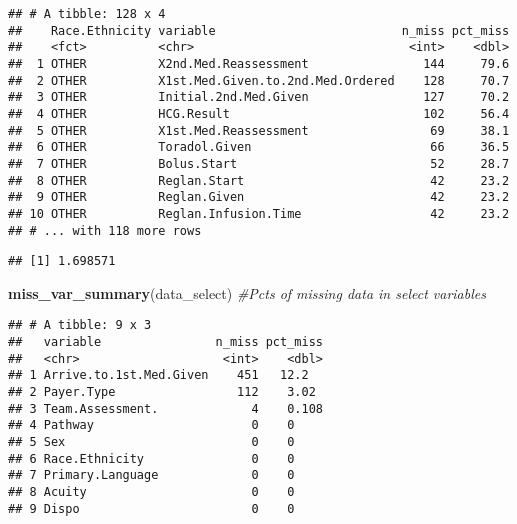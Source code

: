 \documentclass[]{article}
\newenvironment{Shaded}{\begin{snugshade}}{\end{snugshade}}
\newcommand{\KeywordTok}[1]{\textcolor[rgb]{0.13,0.29,0.53}{\textbf{#1}}}
\newcommand{\StringTok}[1]{\textcolor[rgb]{0.31,0.60,0.02}{#1}}
\newcommand{\CommentTok}[1]{\textcolor[rgb]{0.56,0.35,0.01}{\textit{#1}}}
\newcommand{\OperatorTok}[1]{\textcolor[rgb]{0.81,0.36,0.00}{\textbf{#1}}}
\newcommand{\NormalTok}[1]{#1}
\begin{document}
\begin{verbatim}
## # A tibble: 128 x 4
##    Race.Ethnicity variable                          n_miss pct_miss
##    <fct>          <chr>                              <int>    <dbl>
##  1 OTHER          X2nd.Med.Reassessment                144     79.6
##  2 OTHER          X1st.Med.Given.to.2nd.Med.Ordered    128     70.7
##  3 OTHER          Initial.2nd.Med.Given                127     70.2
##  4 OTHER          HCG.Result                           102     56.4
##  5 OTHER          X1st.Med.Reassessment                 69     38.1
##  6 OTHER          Toradol.Given                         66     36.5
##  7 OTHER          Bolus.Start                           52     28.7
##  8 OTHER          Reglan.Start                          42     23.2
##  9 OTHER          Reglan.Given                          42     23.2
## 10 OTHER          Reglan.Infusion.Time                  42     23.2
## # ... with 118 more rows
\end{verbatim}

\begin{Shaded}
\end{Shaded}

\begin{verbatim}
## [1] 1.698571
\end{verbatim}

\begin{Shaded}
\begin{Highlighting}[]
\KeywordTok{miss_var_summary}\NormalTok{(data_select) }\CommentTok{#Pcts of missing data in select variables}
\end{Highlighting}
\end{Shaded}

\begin{verbatim}
## # A tibble: 9 x 3
##   variable                n_miss pct_miss
##   <chr>                    <int>    <dbl>
## 1 Arrive.to.1st.Med.Given    451   12.2  
## 2 Payer.Type                 112    3.02 
## 3 Team.Assessment.             4    0.108
## 4 Pathway                      0    0    
## 5 Sex                          0    0    
## 6 Race.Ethnicity               0    0    
## 7 Primary.Language             0    0    
## 8 Acuity                       0    0    
## 9 Dispo                        0    0
\end{verbatim}
\end{document}
